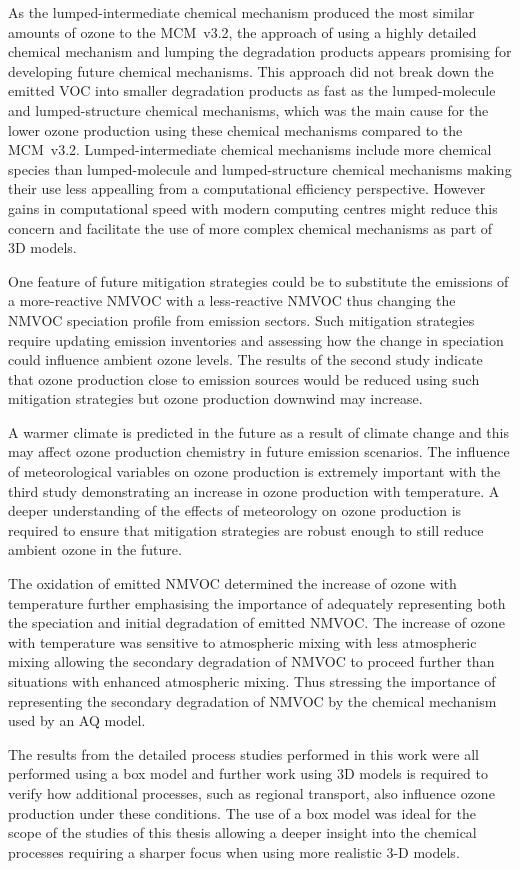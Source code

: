 As the lumped-intermediate chemical mechanism produced the most similar amounts of ozone to the MCM~v3.2, the approach of using a highly detailed chemical mechanism and lumping the degradation products appears promising for developing future chemical mechanisms.
This approach did not break down the emitted VOC into smaller degradation products as fast as the lumped-molecule and lumped-structure chemical mechanisms, which was the main cause for the lower ozone production using these chemical mechanisms compared to the MCM~v3.2.
Lumped-intermediate chemical mechanisms include more chemical species than lumped-molecule and lumped-structure chemical mechanisms making their use less appealling from a computational efficiency perspective.
However gains in computational speed with modern computing centres might reduce this concern and facilitate the use of more complex chemical mechanisms as part of 3D models.

One feature of future mitigation strategies could be to substitute the emissions of a more-reactive NMVOC with a less-reactive NMVOC thus changing the NMVOC speciation profile from emission sectors.
Such mitigation strategies require updating emission inventories and assessing how the change in speciation could influence ambient ozone levels.
The results of the second study indicate that ozone production close to emission sources would be reduced using such mitigation strategies but ozone production downwind may increase.

A warmer climate is predicted in the future as a result of climate change and this may affect ozone production chemistry in future emission scenarios.
The influence of meteorological variables on ozone production is extremely important with the third study demonstrating an increase in ozone production with temperature.
A deeper understanding of the effects of meteorology on ozone production is required to ensure that mitigation strategies are robust enough to still reduce ambient ozone in the future.

The oxidation of emitted NMVOC determined the increase of ozone with temperature further emphasising the importance of adequately representing both the speciation and initial degradation of emitted NMVOC.
The increase of ozone with temperature was sensitive to atmospheric mixing with less atmospheric mixing allowing the secondary degradation of NMVOC to proceed further than situations with enhanced atmospheric mixing.
Thus stressing the importance of representing the secondary degradation of NMVOC by the chemical mechanism used by an AQ model.

The results from the detailed process studies performed in this work were all performed using a box model and further work using 3D models is required to verify how additional processes, such as regional transport, also influence ozone production under these conditions.
The use of a box model was ideal for the scope of the studies of this thesis allowing a deeper insight into the chemical processes requiring a sharper focus when using more realistic 3-D models.
